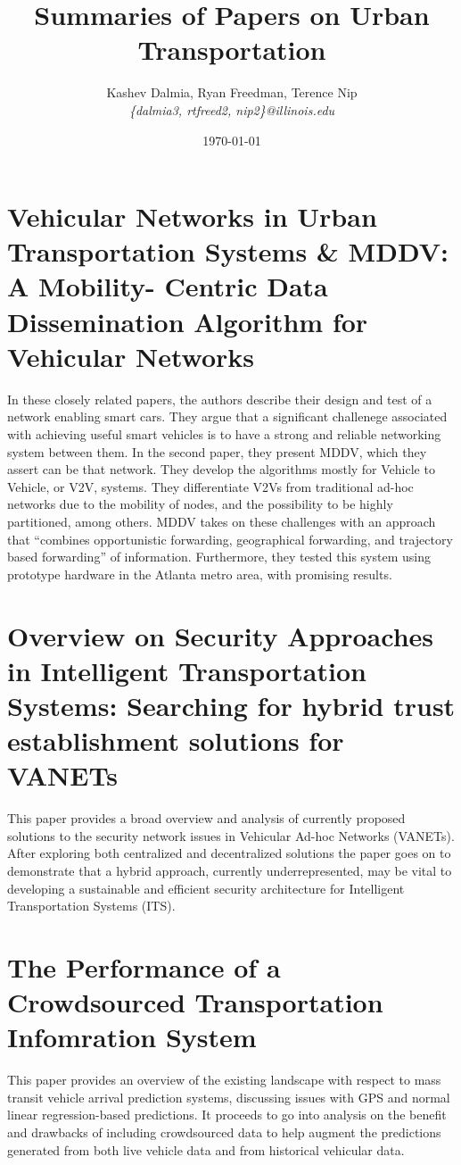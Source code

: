 \documentclass[a4paper]{article}
\title{Summaries of Papers on Urban Transportation}
\author{Kashev Dalmia, Ryan Freedman, Terence Nip \\
        \textit{\{dalmia3, rtfreed2, nip2\}@illinois.edu}
       }
\date{\today}
\begin{document}
\maketitle

\section{Vehicular Networks in Urban Transportation Systems \& MDDV: A Mobility-
Centric Data Dissemination Algorithm for Vehicular Networks}

In these closely related papers, the authors describe their design and test of a
network enabling smart cars. They argue that a significant challenege associated
with achieving useful smart vehicles is to have a strong and reliable networking
system between them. In the second paper, they present MDDV, which they assert
can be that network. They develop the algorithms mostly for Vehicle to Vehicle,
or V2V, systems. They differentiate V2Vs from traditional ad-hoc networks due to
the mobility of nodes, and the possibility to be highly partitioned, among
others. MDDV takes on these challenges with an approach that ``combines
opportunistic forwarding, geographical forwarding, and trajectory based
forwarding'' of information. Furthermore, they tested this system using
prototype hardware in the Atlanta metro area, with promising results.

\section{Overview on Security Approaches in Intelligent Transportation Systems: Searching for hybrid trust establishment solutions for VANETs}
This paper provides a broad overview and analysis of currently proposed solutions to the security network issues in Vehicular Ad-hoc Networks (VANETs). After exploring both centralized and decentralized solutions the paper goes on to demonstrate that a hybrid approach, currently underrepresented, may be vital to developing a sustainable and efficient security architecture for Intelligent Transportation Systems (ITS).

\section{The Performance of a Crowdsourced Transportation Infomration System}
This paper provides an overview of the existing landscape with respect to mass
transit vehicle arrival prediction systems, discussing issues with GPS and
normal linear regression-based predictions. It proceeds to go into analysis on
the benefit and drawbacks of including crowdsourced data to help augment the
predictions generated from both live vehicle data and from historical vehicular
data.
\end{document}
